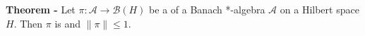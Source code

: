 \documentclass[12pt]{article}
\begin{document}
{\bf Theorem -} Let $\pi : \mathcal{A} \longrightarrow \mathcal{B}(H)$ be a  of a Banach *-algebra $\mathcal{A}$ on a Hilbert space $H$. Then $\pi$ is  and $\| \pi \| \leq 1$.
\end{document}
